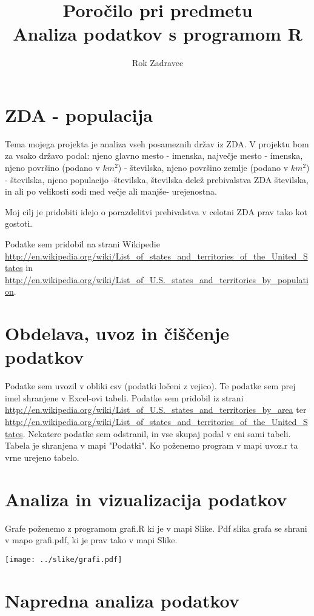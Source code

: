 \documentclass[11pt,a4paper]{article}
\begin{document}
\title{Poročilo pri predmetu \\
Analiza podatkov s programom R}
\author{Rok Zadravec}
\maketitle

\section{ZDA - populacija}

Tema mojega projekta je analiza vseh posameznih držav iz ZDA. V projektu bom za vsako državo podal: njeno glavno mesto - imenska, največje mesto - imenska, njeno površino (podano v $km^2$) - številska, njeno površino zemlje (podano v $km^2$) - številska, njeno populacijo -številska, številska delež prebivalstva ZDA številska, in ali po velikosti sodi med večje ali manjše- urejenostna.

Moj cilj je pridobiti idejo o porazdelitvi prebivalstva v celotni ZDA prav tako kot gostoti.

Podatke sem pridobil na strani Wikipedie \url{http://en.wikipedia.org/wiki/List_of_states_and_territories_of_the_United_States} in \url{http://en.wikipedia.org/wiki/List_of_U.S._states_and_territories_by_population}.

\section{Obdelava, uvoz in čiščenje podatkov}

Podatke sem uvozil v obliki csv (podatki ločeni z vejico). Te podatke sem prej imel shranjene v Excel-ovi tabeli. Podatke sem
pridobil iz strani \url{http://en.wikipedia.org/wiki/List_of_U.S._states_and_territories_by_area} ter
\url{http://en.wikipedia.org/wiki/List_of_states_and_territories_of_the_United_States}. Nekatere podatke sem odstranil, in vse skupaj podal v eni sami tabeli. Tabela je shranjena v mapi "Podatki".
Ko poženemo program v mapi uvoz.r ta vrne urejeno tabelo.

\section{Analiza in vizualizacija podatkov}

Grafe poženemo z programom grafi.R ki je v mapi Slike. Pdf slika grafa se shrani v mapo
grafi.pdf,  ki je prav tako v mapi Slike.

\texttt{[image: ../slike/grafi.pdf]}

\section{Napredna analiza podatkov}

\end{document}
